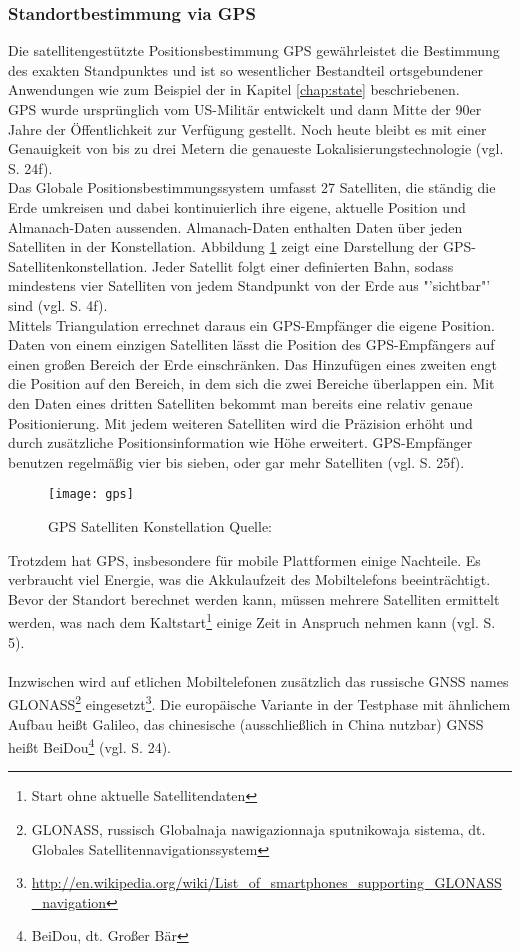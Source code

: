 \subsubsection{Standortbestimmung via \gls{GPS}}
Die satellitengestützte Positionsbestimmung \gls{GPS} gewährleistet die Bestimmung des exakten Standpunktes und ist so wesentlicher Bestandteil ortsgebundener Anwendungen wie zum Beispiel der in Kapitel \ref{chap:state} beschriebenen. \\
\gls{GPS} wurde ursprünglich vom US-Militär entwickelt und dann Mitte der 90er Jahre der Öffentlichkeit zur Verfügung gestellt. Noch heute bleibt es mit einer Genauigkeit von bis zu drei Metern die genaueste Lokalisierungstechnologie (vgl. \cite{gps} S. 24f).\\
Das Globale Positionsbestimmungssystem umfasst 27 Satelliten, die ständig die Erde umkreisen und dabei kontinuierlich ihre eigene, aktuelle Position und Almanach-Daten aussenden. Almanach-Daten enthalten Daten über jeden Satelliten in der Konstellation. Abbildung \ref{fig:gps} zeigt eine Darstellung der GPS-Satellitenkonstellation. Jeder Satellit folgt einer definierten Bahn, sodass mindestens vier Satelliten von jedem Standpunkt von der Erde aus "'sichtbar"' sind (vgl. \cite{location} S. 4f).\\
Mittels Triangulation errechnet daraus ein \gls{GPS}-Empfänger die eigene Position. Daten von einem einzigen Satelliten lässt die Position des \gls{GPS}-Empfängers auf einen großen Bereich der Erde einschränken. Das Hinzufügen eines zweiten engt die Position auf den Bereich, in dem sich die zwei Bereiche überlappen ein. Mit den Daten eines dritten Satelliten bekommt man bereits eine relativ genaue Positionierung. Mit jedem weiteren Satelliten wird die Präzision erhöht und durch zusätzliche Positionsinformation wie Höhe erweitert. \gls{GPS}-Empfänger benutzen regelmäßig vier bis sieben, oder gar mehr Satelliten (vgl. \cite{gps} S. 25f).\\
\begin{figure}[H]  
    \centering  
    \texttt{[image: gps]} 
    \grayRule
    \caption[GPS Satelliten Konstellation]{GPS Satelliten Konstellation  Quelle: \cite{fig:gps}}
    \label{fig:gps}
\end{figure}
Trotzdem hat \gls{GPS}, insbesondere für mobile Plattformen einige Nachteile. Es verbraucht viel Energie, was die Akkulaufzeit des Mobiltelefons beeinträchtigt. Bevor der Standort berechnet werden kann, müssen mehrere Satelliten ermittelt werden, was nach dem Kaltstart\footnote{ Start ohne aktuelle Satellitendaten} einige Zeit in Anspruch nehmen kann (vgl. \cite{location} S. 5).\\\\
Inzwischen wird auf etlichen Mobiltelefonen zusätzlich das russische \gls{GNSS} names GLONASS\footnote{ GLONASS, russisch Globalnaja nawigazionnaja sputnikowaja sistema, dt. Globales Satellitennavigationssystem} eingesetzt\footnote{ \url{http://en.wikipedia.org/wiki/List_of_smartphones_supporting_GLONASS_navigation}}.
Die europäische Variante in der Testphase mit ähnlichem Aufbau heißt Galileo, das chinesische (ausschließlich in China nutzbar) \gls{GNSS} heißt BeiDou\footnote{ BeiDou, dt. Großer Bär} (vgl. \cite{gps} S. 24).
